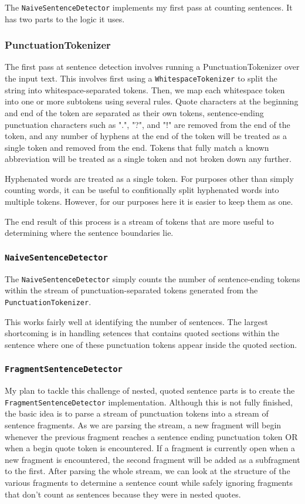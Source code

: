 \documentclass{article}
\begin{document}
The \texttt{NaiveSentenceDetector} implements my first pass at counting sentences. It has two parts to the logic it uses.

\subsubsection{PunctuationTokenizer}
The first pass at sentence detection involves running a PunctuationTokenizer over the input text. This involves first using a \texttt{WhitespaceTokenizer} to split the string into whitespace-separated tokens. Then, we map each whitespace token into one or more subtokens using several rules. Quote characters at the beginning and end of the token are separated as their own tokens, sentence-ending punctuation characters such as ".", "?", and "!" are removed from the end of the token, and any number of hyphens at the end of the token will be treated as a single token and removed from the end. Tokens that fully match a known abbreviation will be treated as a single token and not broken down any further.

Hyphenated words are treated as a single token. For purposes other than simply counting words, it can be useful to confitionally split hyphenated words into multiple tokens. However, for our purposes here it is easier to keep them as one.

The end result of this process is a stream of tokens that are more useful to determining where the sentence boundaries lie.

\subsubsection{\texttt{NaiveSentenceDetector}}
The \texttt{NaiveSentenceDetector} simply counts the number of sentence-ending tokens within the stream of punctuation-separated tokens generated from the \texttt{PunctuationTokenizer}.

This works fairly well at identifying the number of sentences. The largest shortcoming is in handling setences that contains quoted sections within the sentence where one of these punctuation tokens appear inside the quoted section.

\subsubsection{\texttt{FragmentSentenceDetector}}
\label{sec:frag}
My plan to tackle this challenge of nested, quoted sentence parts is to create the \texttt{FragmentSentenceDetector} implementation. Although this is not fully finished, the basic idea is to parse a stream of punctuation tokens into a stream of sentence fragments. As we are parsing the stream, a new fragment will begin whenever the previous fragment reaches a sentence ending punctuation token OR when a begin quote token is encountered. If a fragment is currently open when a new fragment is encountered, the second fragment will be added as a subfragment to the first. After parsing the whole stream, we can look at the structure of the various fragments to determine a sentence count while safely ignoring fragments that don't count as sentences because they were in nested quotes.
\end{document}
